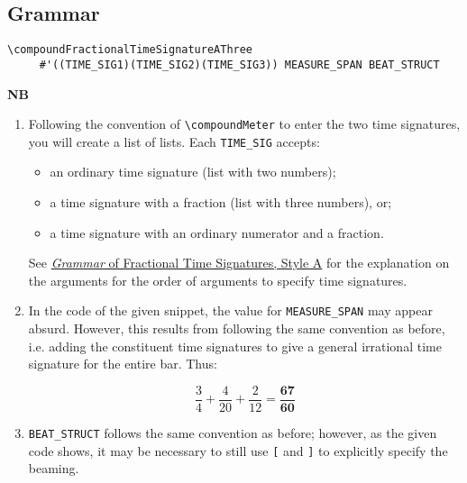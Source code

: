 \subsection{Grammar}
\label{sec:compoundfractionalmeter_grammar}
\begin{verbatim}
\compoundFractionalTimeSignatureAThree 
     #'((TIME_SIG1)(TIME_SIG2)(TIME_SIG3)) MEASURE_SPAN BEAT_STRUCT
\end{verbatim}
\textbf{NB} 
\begin{enumerate}
\item Following the convention of \verb|\compoundMeter| to enter the two time signatures, you will create a list of lists. Each \verb|TIME_SIG| accepts: 
\begin{itemize}
\item an ordinary time signature (list with two numbers);
\item a time signature with a fraction (list with three numbers), or; 
\item a time signature with an ordinary numerator and a fraction.
\end{itemize} 
See \hyperref[sec:time_signatures_styleA_convention]{\textit{Grammar} of Fractional Time Signatures, Style A} for the explanation on the arguments for the order of arguments to specify time signatures.
\item In the code of the given snippet, the value for \verb|MEASURE_SPAN| may appear absurd. However, this results from following the same convention as before, i.e. adding the constituent time signatures to give a general irrational time signature for the entire bar. Thus: \par
\[ \frac{3}{4} +\frac{4}{20} + \frac{2}{12} = \mathbf{\frac{67}{60}}\] \par
\item \verb|BEAT_STRUCT| follows the same convention as before; however, as the given code shows, it may be necessary to still use \verb|[| and \verb|]| to explicitly specify the beaming. 
\end{enumerate}
